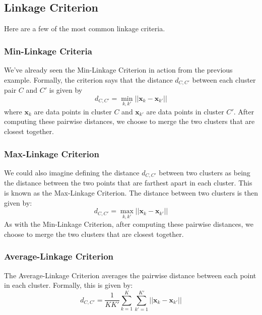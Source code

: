 \subsection{Linkage Criterion}
Here are a few of the most common linkage criteria.

\subsubsection{Min-Linkage Criteria}
We've already seen the Min-Linkage Criterion in action from the previous example. Formally, the criterion says that the distance $d_{C, C'}$ between each cluster pair $C$ and $C'$ is given by
\begin{equation} \label{min-linkage-crit}
	d_{C, C'} = \underset{k, k'}{\min} || \textbf{x}_{k} - \textbf{x}_{k'} ||
\end{equation}
where $\textbf{x}_{k}$ are data points in cluster $C$ and $\textbf{x}_{k'}$ are data points in cluster $C'$. After computing these pairwise distances, we choose to merge the two clusters that are closest together.

\subsubsection{Max-Linkage Criterion}
We could also imagine defining the distance $d_{C, C'}$ between two clusters as being the distance between the two points that are farthest apart in each cluster. This is known as the Max-Linkage Criterion. The distance between two clusters is then given by:
\begin{equation} \label{max-linkage-crit}
	d_{C, C'} = \underset{k, k'}{\max} || \textbf{x}_{k} - \textbf{x}_{k'} ||
\end{equation}
As with the Min-Linkage Criterion, after computing these pairwise distances, we choose to merge the two clusters that are closest together.


\subsubsection{Average-Linkage Criterion}
The Average-Linkage Criterion averages the pairwise distance between each point in each cluster. Formally, this is given by:
\begin{equation} \label{avg-linkage-crit}
	d_{C, C'} = \frac{1}{K K'} \sum_{k=1}^{K} \sum_{k'=1}^{K'} || \textbf{x}_{k} - \textbf{x}_{k'} ||
\end{equation}

